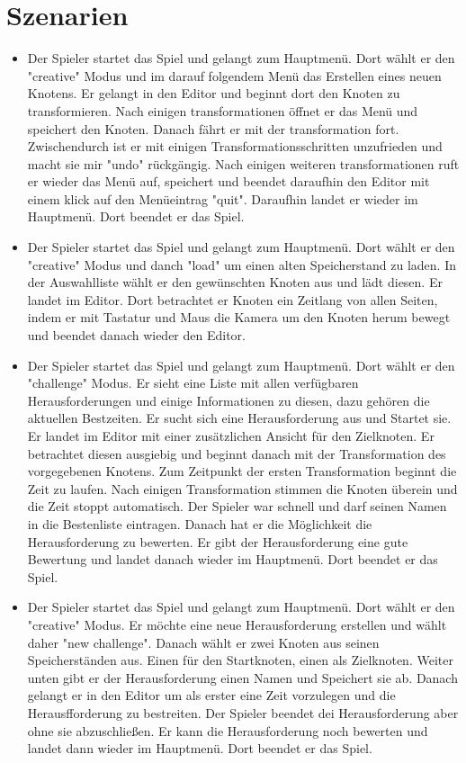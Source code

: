 	
\clearpage
	
\section{Szenarien}
\begin{itemize}	
\item Der Spieler startet das Spiel und gelangt zum Hauptmenü. Dort wählt er den "creative" Modus und im darauf folgendem Menü das Erstellen eines neuen Knotens. Er gelangt in den Editor und beginnt dort den Knoten zu transformieren. Nach einigen transformationen öffnet er das Menü und speichert den Knoten. Danach fährt er mit der transformation fort. Zwischendurch ist er mit einigen Transformationsschritten unzufrieden und macht sie mir "undo" rückgängig. Nach einigen weiteren transformationen ruft er wieder das Menü auf, speichert und beendet daraufhin den Editor mit einem klick auf den Menüeintrag "quit". Daraufhin landet er wieder im Hauptmenü. Dort beendet er das Spiel.

\item Der Spieler startet das Spiel und gelangt zum Hauptmenü. Dort wählt er den "creative" Modus und danch "load" um einen alten Speicherstand zu laden. In der Auswahlliste wählt er den gewünschten Knoten aus und lädt diesen. Er landet im Editor. Dort betrachtet er Knoten ein Zeitlang von allen Seiten, indem er mit Tastatur und Maus die Kamera um den Knoten herum bewegt und beendet danach wieder den Editor.

\item  Der Spieler startet das Spiel und gelangt zum Hauptmenü. Dort wählt er den "challenge" Modus. Er sieht eine Liste mit allen verfügbaren Herausforderungen und einige Informationen zu diesen, dazu gehören die aktuellen Bestzeiten. Er sucht sich eine Herausforderung aus und Startet sie. Er landet im Editor mit einer zusätzlichen Ansicht für den Zielknoten. Er betrachtet diesen ausgiebig und beginnt danach mit der Transformation des vorgegebenen Knotens. Zum Zeitpunkt der ersten Transformation beginnt die Zeit zu laufen. Nach einigen Transformation stimmen die Knoten überein und die Zeit stoppt automatisch. Der Spieler war schnell und darf seinen Namen in die Bestenliste eintragen. Danach hat er die Möglichkeit die Herausforderung zu bewerten. Er gibt der Herausforderung eine gute Bewertung und landet danach wieder im Hauptmenü. Dort beendet er das Spiel.

\item Der Spieler startet das Spiel und gelangt zum Hauptmenü. Dort wählt er den "creative" Modus. Er möchte eine neue Herausforderung erstellen und wählt daher "new challenge". Danach wählt er zwei Knoten aus seinen Speicherständen aus. Einen für den Startknoten, einen als Zielknoten. Weiter unten gibt er der Herausforderung einen Namen und Speichert sie ab. Danach gelangt er in den Editor um als erster eine Zeit vorzulegen und die Herausfforderung zu bestreiten. Der Spieler beendet dei Herausforderung aber ohne sie abzuschließen. Er kann die Herausforderung noch bewerten und landet dann wieder im Hauptmenü. Dort beendet er das Spiel.
\end{itemize}

%	  



